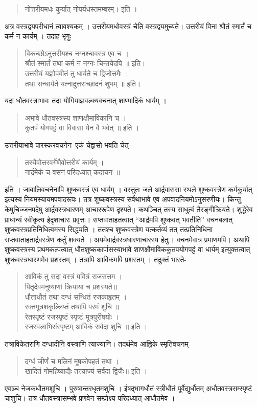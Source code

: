 \begin{verse}
नोत्तरीयमधः कुर्यात् नोपर्यधस्तमम्बरम्। इति । 
\end{verse}
अत्र वस्त्रद्वयपरीधानं त्वावश्यकम् । उत्तरीयमधोवस्त्रं चेति वस्त्रद्वयमुच्यते। उत्तरीयं विना श्रौतं स्मार्तं च कर्म न कार्यम् । तदाह भृगुः \ 
\begin{verse}
विकच्छोऽनुत्तरीयश्च नग्नश्चावस्त्र एव च । \\
श्रौतं स्मार्तं तथा कर्म न नग्नः चिन्तयेदपि ॥ इति। \\
उत्तरीयं यज्ञोपवीतं तु  धार्यते च द्विजोत्तमैः । \\
तथा सन्धार्यते यत्नादुत्तराच्छादनं शुभम् ॥ इति। 
\end{verse}
यदा धौतवस्त्राभावः तदा योगियाज्ञवल्क्यवचनात् शाण्मादिकं धार्यम् । 
\begin{verse}
अभावे धौतवस्त्रस्य शाणक्षौमाविकानि च ।\\
कुतपं योगपट्टं वा विवासा येन वै भवेत् ॥ इति । 
\end{verse}
उत्तरीयाभावे पारस्करवचनेन\ एकं चेद्वासो भवति चेत् -
\begin{verse}
तस्यैवोत्तरवर्गेणैवोत्तरीयं कार्यम् । \\
नार्द्रमेकं च वसनं परिदध्यात् कदाचन ॥ 
\end{verse}
इति । जाबालिवचनेनापि शुष्कवस्त्रं एव धार्यम् । वस्तुतः जले आर्द्रवाससा स्थले शुष्कवस्त्रेण कर्मकुर्यात् इत्यस्य नियमस्यायमपवादरूपः। तत्र शुष्कवस्त्रस्य सर्वथाभावे एव अपवादनियमोऽनुसरणीयः। किन्तु केषुचिज्जनपदेषु आर्द्रवस्त्रधारणम् आचाररूपेण दृश्यते। कथञ्चित् तस्य साधुत्वं तैरङ्गीक्रियते। शुद्धेरेव प्राधान्यं स्वीकृत्य ईदृशाचारः प्रवृत्तः। सप्तवाताहतत्वात् “आर्द्रमपि शुष्कवत् भवतीति” वचनबलात् शुष्कवस्त्रप्रतिनिधित्वमस्य सिद्ध्यति । ततश्च शुष्कवस्त्रेण यत्कर्तव्यं तत् तत्प्रतिनिधिना सप्तवाताहतार्द्रवस्त्रेण कर्तुं शक्यते । अयमेवार्द्रवस्त्रधारणाचारस्य हेतुः। वचनमेवात्र प्रमाणमपि। अथापि शुष्कवस्त्रस्य प्रथमकल्पत्वात् धौतशुष्ककार्पासस्याभावे शाणक्षौमाविककुतपयोगपट्टं वा धार्यम् इत्युक्तत्वात् शुष्कवस्त्रधारणमेव प्रशस्तम् । तत्रापि आविकमपि प्रशस्तम् । तदुक्तं भारते- 
\begin{verse}
आविकं तु सदा वस्त्रं पवित्रं राजसत्तम । \\
पितृदेवमनुष्याणां क्रियायां च प्रशस्यते॥ \\
धौताधौतं तथा दग्धं सन्धितं रजकाहृतम् । \\
रक्तमूत्रशकृल्लिप्तं तथापि परमं शुचि ॥\\
रेतस्पृष्टं रजस्पृष्टं स्पृष्टं मूत्रपुरीषयोः ।\\
रजस्वलाभिसंस्पृष्टम् आविकं सर्वदा शुचि ॥ इति ।
\end{verse}
तत्राविकेतराणि दग्धादीनि वस्त्राणि त्याज्यानि। तदर्थमेव आह्निके स्मृतिवचनम् 
\begin{verse}
दग्धं जीर्णं च मलिनं मूषकोपहतं तथा । \\
खादितं गोमहिष्याद्यैः तत्त्याज्यं सर्वदा द्विजैः॥ इति । 
\end{verse}
एवञ्च नेजकधौतमशुचि । पुरुषान्तरधृतमशुचि । ईषद्भागधौतं स्त्रीधौतं पूर्वेद्युर्धौतम् अधौतवस्त्रसम्स्पृष्टं चाशुचि। तत्र धौतवस्त्रासम्भवे प्रणवेन सम्प्रोक्ष्य परिदध्यात् आधौतमेव । 

